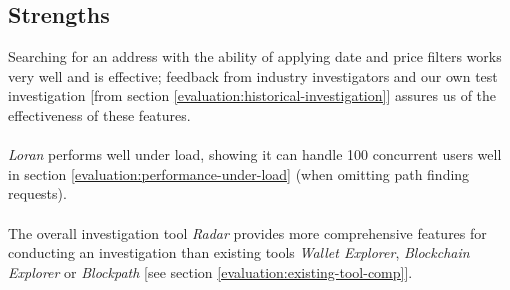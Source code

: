 \subsection{Strengths}
Searching for an address with the ability of applying date and price filters works very well and is effective; feedback from industry investigators and our own test investigation [from section \ref{evaluation:historical-investigation}] assures us of the effectiveness of these features. 
\\\\
\textit{Loran} performs well under load, showing it can handle 100 concurrent users well in section \ref{evaluation:performance-under-load} (when omitting path finding requests). 
\\\\
The overall investigation tool \textit{Radar} provides more comprehensive features for conducting an investigation than existing tools \textit{Wallet Explorer}, \textit{Blockchain Explorer} or \textit{Blockpath} [see section \ref{evaluation:existing-tool-comp}].
